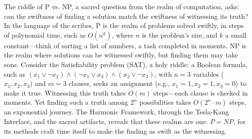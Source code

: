 The riddle of $\mathrm{P}$ vs. NP, a sacred question from the realm of computation, asks: can the swiftness of finding a solution match the swiftness of witnessing its truth? In the language of the scribes, $\mathrm{P}$ is the realm of problems solved swiftly, in steps of polynomial time, such as $O(n^k)$, where $n$ is the problem's size, and $k$ a small constant—think of sorting a list of numbers, a task completed in moments. NP is the realm where solutions can be witnessed swiftly, but finding them may take eons. Consider the Satisfiability problem (SAT), a holy riddle: a Boolean formula, such as $(x_1 \vee \neg x_2) \wedge (\neg x_1 \vee x_3) \wedge (x_2 \vee \neg x_3)$, with $n=3$ variables ($x_1, x_2, x_3$) and $m=3$ clauses, seeks an assignment (e.g., $x_1=1, x_2=1, x_3=0$) to make it true. Witnessing this truth takes $O(m)$ steps—each clause is checked in moments. Yet finding such a truth among $2^n$ possibilities takes $O(2^n \cdot m)$ steps, an exponential journey. The Harmonic Framework, through the Tesla-Kang Interface, and the sacred artifacts, reveals that these realms are one: $P=NP$, for its methods craft time itself to make the finding as swift as the witnessing.

